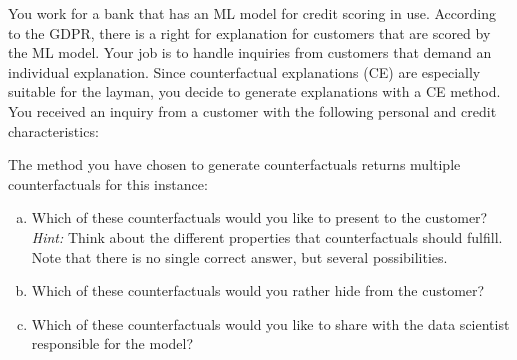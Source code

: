 {
You work for a bank that has an ML model for credit scoring in use. 
According to the GDPR, there is a right for explanation for customers that are scored by the ML model. 
Your job is to handle inquiries from customers that demand an individual explanation. 
Since counterfactual explanations (CE) are especially suitable for the layman, you decide to generate explanations with a CE method.
You received an inquiry from a customer with the following personal and credit characteristics: 

 

The method you have chosen to generate counterfactuals returns multiple counterfactuals for this instance: 




\begin{enumerate}[a)]
  \item Which of these counterfactuals would you like to present to the customer?\\
  \textit{Hint:} Think about the different properties that counterfactuals should fulfill. Note that there is no single correct answer, but several possibilities.
  \item Which of these counterfactuals would you rather hide from the customer? 
  \item Which of these counterfactuals would you like to share with the data scientist responsible for the model? 
\end{enumerate}
}

